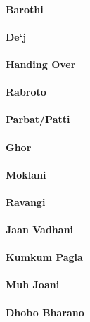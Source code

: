 \paragraph{Barothi}

\paragraph{De`j}

\paragraph{Handing Over}

\paragraph{Rabroto}

\paragraph{Parbat/Patti}

\paragraph{Ghor}

\paragraph{Moklani}

\paragraph{Ravangi}

\paragraph{Jaan Vadhani}

\paragraph{Kumkum Pagla}

\paragraph{Muh Joani}

\paragraph{Dhobo Bharano}

